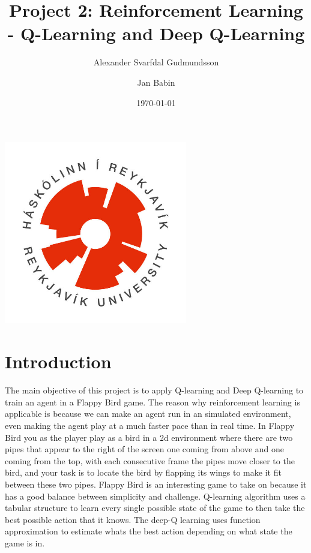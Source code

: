\documentclass[a4paper,12pt]{article}
\title{Project 2: Reinforcement Learning - Q-Learning and Deep Q-Learning}
\author{Alexander Svarfdal Gudmundsson \and Jan Babin}
\date{\today}
\begin{document}
\maketitle

\begin{center}  
    \includegraphics[width=0.6\textwidth]{HR_logo.jpg}
\end{center}

\clearpage

\tableofcontents

\clearpage

\section{Introduction}
The main objective of this project is to apply Q-learning and Deep Q-learning to train an agent in a Flappy Bird game. 
The reason why reinforcement learning is applicable is because we can make an agent run in an simulated environment, 
even making the agent play at a much faster pace than in real time. 
In Flappy Bird you as the player play as a bird in a 2d environment where there are two pipes that appear to the right of the screen one coming from above and one coming from the top, 
with each consecutive frame the pipes move closer to the bird, and your task is to locate the bird by flapping its wings to make it fit between these two pipes. 
Flappy Bird is an interesting game to take on because it has a good balance between simplicity and challenge. 
Q-learning algorithm uses a tabular structure to learn every single possible state of the game to then take the best possible action that it knows. 
The deep-Q learning uses function approximation to estimate whats the best action depending on what state the game is in. 
\end{document}
